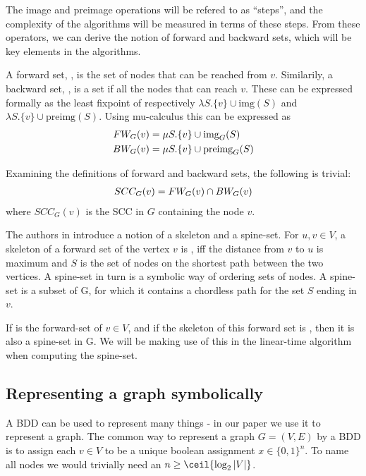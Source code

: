 \documentclass[../master/master.tex]{subfiles}
\begin{document}
The image and preimage operations will be refered to as ``steps'', and the complexity of the algorithms will be measured in terms of these steps. 
From these operators, we can derive the notion of forward and backward sets, which will be key elements in the algorithms.

A forward set, , is the set of nodes that can be reached from $v$. Similarily, a backward set, , is a set if all the nodes that can reach $v$. These can be expressed formally as the least fixpoint of respectively $\lambda S.\{v\}\cup \text{img}(S)$ and $\lambda S.\{v\}\cup \text{preimg}(S)$. Using mu-calculus \cite{clarke_peled_grumberg_1999} this can be expressed as 
\begin{align}\label{fw}
FW_{G}(v) &= \mu S.\{v\}\cup \text{img}_G(S)\\
\label{bw}BW_{G}(v) &= \mu S.\{v\}\cup \text{preimg}_G(S)
\end{align}

\noindent Examining the definitions of forward and backward sets, the following is trivial:
\begin{align}
SCC_G(v) = FW_{G}(v) \cap BW_{G}(v) \label{scc}
\end{align} 
where $SCC_G(v)$ is the SCC in $G$ containing the node $v$.

The authors in \cite{linear} introduce a notion of a skeleton and a spine-set. For $u, v \in V$, a skeleton of a forward set of the vertex $v$  is , iff the distance from $v$ to $u$ is maximum and $S$ is the set of nodes on the shortest path between the two vertices.
A spine-set in turn is a symbolic way of ordering sets of nodes. A spine-set is a subset  of G, for which it contains a chordless path for the set $S$ ending in $v$.

If  is the forward-set of $v \in V$, and if the skeleton of this forward set is , then it is also a spine-set in G. We will be making use of this in the linear-time algorithm when computing the spine-set. 

\subsection{Representing a graph symbolically}
A BDD can be used to represent many things - in our paper we use it to represent a graph. The common way to represent a graph $G = (V, E)$ by a BDD is to assign each $v\in V$ to be a unique boolean assignment $x\in\{0,1\}^n$. To name all nodes we would trivially need an $n \geq \ceil{\log_2{|V|}}$.
\end{document}
